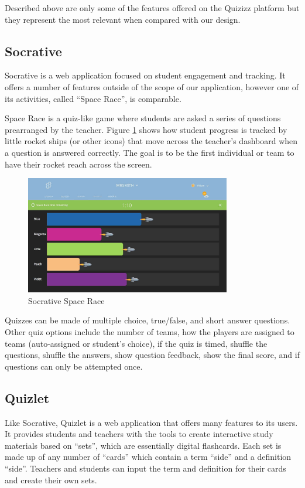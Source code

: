 \documentclass{article}
\begin{document}
        Described above are only some of the features offered on the Quizizz platform but they represent the most relevant when compared with our design.
    
    \subsection{Socrative}
        Socrative is a web application focused on student engagement and tracking. It offers a number of features outside of the scope of our application, however one of its activities, called ``Space Race'', is comparable.
        \smallskip
        
        Space Race is a quiz-like game where students are asked a series of questions prearranged by the teacher. Figure \ref{fig:socrative-space-race} shows how student progress is tracked by little rocket ships (or other icons) that move across the teacher's dashboard when a question is answered correctly. The goal is to be the first individual or team to have their rocket reach across the screen.
        \smallskip
        
        \begin{figure}[ht]
            \centering
            \includegraphics[width=0.8\textwidth]{images/socrative-space_race.jpg}
            \caption{Socrative Space Race \cite{socrative}}
            \label{fig:socrative-space-race}
        \end{figure}
        
        Quizzes can be made of multiple choice, true/false, and short answer questions. Other quiz options include the number of teams, how the players are assigned to teams (auto-assigned or student's choice), if the quiz is timed, shuffle the questions, shuffle the answers, show question feedback, show the final score, and if questions can only be attempted once.
    
    \subsection{Quizlet}
        Like Socrative, Quizlet is a web application that offers many features to its users. It provides students and teachers with the tools to create interactive study materials based on ``sets'', which are essentially digital flashcards. Each set is made up of any number of ``cards'' which contain a term ``side'' and a definition ``side''. Teachers and students can input the term and definition for their cards and create their own sets.
        \smallskip
        
\end{document}
